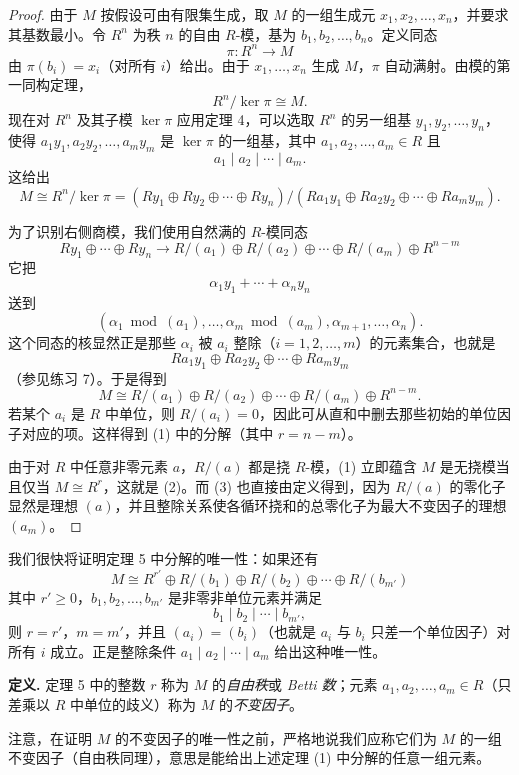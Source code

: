 \begin{proof}
由于 $M$ 按假设可由有限集生成，取 $M$ 的一组生成元 $x_1,x_2,\ldots,x_n$，并要求其基数最小。令 $R^n$ 为秩 $n$ 的自由 $R$-模，基为 $b_1,b_2,\ldots,b_n$。定义同态
\[
\pi:R^n\longrightarrow M
\]
由 $\pi(b_i)=x_i$（对所有 $i$）给出。由于 $x_1,\ldots,x_n$ 生成 $M$，$\pi$ 自动满射。由模的第一同构定理，
\[
R^n/\ker\pi\cong M.
\]
现在对 $R^n$ 及其子模 $\ker\pi$ 应用定理 4，可以选取 $R^n$ 的另一组基 $y_1,y_2,\ldots,y_n$，使得 $a_1y_1,a_2y_2,\ldots,a_my_m$ 是 $\ker\pi$ 的一组基，其中 $a_1,a_2,\ldots,a_m\in R$ 且
\[
a_1\mid a_2\mid\cdots\mid a_m.
\]
这给出
\[
M\cong R^n/\ker\pi=(Ry_1\oplus Ry_2\oplus\cdots\oplus Ry_n)/(Ra_1y_1\oplus Ra_2y_2\oplus\cdots\oplus Ra_my_m).
\]

为了识别右侧商模，我们使用自然满的 $R$-模同态
\[
Ry_1\oplus\cdots\oplus Ry_n\longrightarrow R/(a_1)\oplus R/(a_2)\oplus\cdots\oplus R/(a_m)\oplus R^{n-m}
\]
它把
\[
\alpha_1y_1+\cdots+\alpha_ny_n
\]
送到
\[
(\alpha_1\bmod(a_1),\ldots,\alpha_m\bmod(a_m),\alpha_{m+1},\ldots,\alpha_n).
\]
这个同态的核显然正是那些 $\alpha_i$ 被 $a_i$ 整除（$i=1,2,\ldots,m$）的元素集合，也就是
\[
Ra_1y_1\oplus Ra_2y_2\oplus\cdots\oplus Ra_my_m
\]
（参见练习 7）。于是得到
\[
M\cong R/(a_1)\oplus R/(a_2)\oplus\cdots\oplus R/(a_m)\oplus R^{n-m}.
\]
若某个 $a_i$ 是 $R$ 中单位，则 $R/(a_i)=0$，因此可从直和中删去那些初始的单位因子对应的项。这样得到 (1) 中的分解（其中 $r=n-m$）。

由于对 $R$ 中任意非零元素 $a$，$R/(a)$ 都是挠 $R$-模，(1) 立即蕴含 $M$ 是无挠模当且仅当 $M\cong R^r$，这就是 (2)。而 (3) 也直接由定义得到，因为 $R/(a)$ 的零化子显然是理想 $(a)$，并且整除关系使各循环挠和的总零化子为最大不变因子的理想 $(a_m)$。
\end{proof}

我们很快将证明定理 5 中分解的唯一性：如果还有
\[
M\cong R^{r'}\oplus R/(b_1)\oplus R/(b_2)\oplus\cdots\oplus R/(b_{m'})
\]
其中 $r'\geq0$，$b_1,b_2,\ldots,b_{m'}$ 是非零非单位元素并满足
\[
b_1\mid b_2\mid\cdots\mid b_{m'},
\]
则 $r=r'$，$m=m'$，并且 $(a_i)=(b_i)$（也就是 $a_i$ 与 $b_i$ 只差一个单位因子）对所有 $i$ 成立。正是整除条件 $a_1\mid a_2\mid\cdots\mid a_m$ 给出这种唯一性。

\noindent\textbf{定义.} 定理 5 中的整数 $r$ 称为 $M$ 的\emph{自由秩}或 \emph{Betti 数}；元素 $a_1,a_2,\ldots,a_m\in R$（只差乘以 $R$ 中单位的歧义）称为 $M$ 的\emph{不变因子}。

注意，在证明 $M$ 的不变因子的唯一性之前，严格地说我们应称它们为 $M$ 的一组不变因子（自由秩同理），意思是能给出上述定理 (1) 中分解的任意一组元素。

